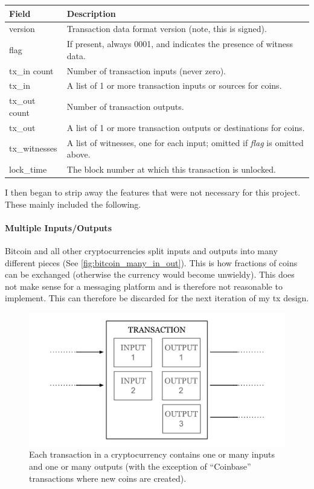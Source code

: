 \documentclass{article}
\begin{document}
\begin{table}[H]
\centering
\begin{tabular}{ |l|p{8.5cm}| }
\hline
\rowcolor{tblgrey}
Field   & Description                                                                   \\ \hline
version       & Transaction data format version (note, this is signed).                    \\ \hline
flag          & If present, always 0001, and indicates the presence of witness data.       \\ \hline
tx\_in count  & Number of transaction inputs (never zero).                                 \\ \hline
tx\_in        & A list of 1 or more transaction inputs or sources for coins.               \\ \hline
tx\_out count & Number of transaction outputs.                                             \\ \hline
tx\_out       & A list of 1 or more transaction outputs or destinations for coins.         \\ \hline
tx\_witnesses & A list of witnesses, one for each input; omitted if \textit{flag} is omitted above. \\ \hline
lock\_time    & The block number at which this transaction is unlocked.       \\ \hline
\end{tabular}
\end{table}

I then began to strip away the features that were not necessary for this project. These mainly included the following.
\paragraph{Multiple Inputs/Outputs}
Bitcoin and all other cryptocurrencies split inputs and outputs into many different pieces (See \autoref{fig:bitcoin_many_in_out}). This is how fractions of coins can be exchanged (otherwise the currency would become unwieldy). This does not make sense for a messaging platform and is therefore not reasonable to implement. This can therefore be discarded for the next iteration of my tx design.
\begin{figure}[h]
    \centering
    \includegraphics[width=0.75\linewidth]{Images/Diagrams/blockchain_many_inputs_outputs.png}
    \caption{Each transaction in a cryptocurrency contains one or many inputs and one or many outputs (with the exception of ``Coinbase'' transactions where new coins are created).}
    \label{fig:bitcoin_many_in_out}
\end{figure}
\end{document}
